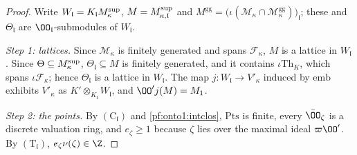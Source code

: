 \begin{proof}
Write $W_{\mathfrak l}=K_{\mathfrak l}M^{\mathrm{sup}}_\kappa$, $M=M^{\mathrm{sup}}_{\kappa,\mathfrak l}$ and
$M^{\mathrm{gg}}=\bigl(\iota(\mathcal M_\kappa\cap\mathcal M^{\mathrm{gg}}_\kappa)\bigr)_{\mathfrak l}$; these and $\Theta_{\mathfrak
l}$ are $\OO_{\mathfrak l}$-submodules of $W_{\mathfrak l}$.

\emph{Step 1: lattices.} Since $\mathcal M_\kappa$ is finitely generated and spans $\mathcal F_\kappa$, $M$ is a lattice in
$W_{\mathfrak l}$. Since $\Theta\subseteq M^{\mathrm{sup}}_\kappa$, $\Theta_{\mathfrak l}\subseteq M$ is finitely generated, and it
contains $\iota\mathrm{Th}_K$, which spans $\iota\mathcal F_\kappa$; hence $\Theta_{\mathfrak l}$ is a lattice in $W_{\mathfrak
l}$. The map $j\colon W_{\mathfrak l}\to V'_\kappa$ induced by $\mathrm{emb}$ exhibits $V'_\kappa$ as $K'\otimes_{K_{\mathfrak
l}}W_{\mathfrak l}$, and $\OO'j(M)=M_1$.

\emph{Step 2: the points.} By $(\mathrm C_{\mathfrak l})$ and \cref{pf:onto1:intclos}, $\mathrm{Pts}$ is finite, every
$\bar\OO_\zeta$ is a discrete valuation ring, and $e_\zeta\ge1$ because $\zeta$ lies over the maximal ideal
$\varpi\OO'$. By $(\mathrm T_{\mathfrak l})$, $e_\zeta\nu(\zeta)\in\Z$.


\end{proof}
